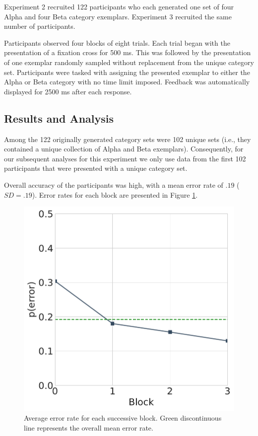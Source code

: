 Experiment 2 recruited 122 participants who each generated one set of four Alpha
and four Beta category exemplars. Experiment 3 recruited the same number of
participants.

Participants observed four blocks of eight trials. Each trial began with the
presentation of a fixation cross for 500 ms. This was followed by the
presentation of one exemplar randomly sampled without replacement from the
unique category set. Participants were tasked with assigning the presented
exemplar to either the Alpha or Beta category with no time limit imposed.
Feedback was automatically displayed for 2500 ms after each response.

\subsection{Results and Analysis}

Among the 122 originally generated category sets were 102 unique sets (i.e.,
they contained a unique collection of Alpha and Beta exemplars). Consequently,
for our subsequent analyses for this experiment we only use data from the first
102 participants that were presented with a unique category set.

Overall accuracy of the participants was high, with a mean error rate of $.19$
($SD = .19$). Error rates for each block are presented in Figure
\ref{fig:learningcurve}.

\begin{figure}
    \begin{center}
    \includegraphics[width=\textwidth/2]{figs/e3-learningcurve.pdf}
    \caption{Average error rate for each successive block. Green discontinuous
line represents the overall mean error rate.}
    \label{fig:learningcurve}
    \end{center}
\end{figure}

